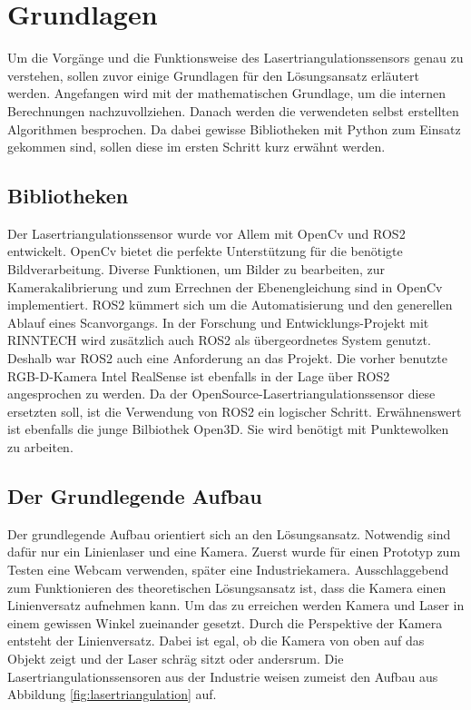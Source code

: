 \section{Grundlagen}\label{grundlagen}
	Um die Vorgänge und die Funktionsweise des Lasertriangulationssensors genau zu verstehen, sollen zuvor einige Grundlagen für den Lösungsansatz erläutert werden. Angefangen wird mit der mathematischen Grundlage, um die internen Berechnungen nachzuvollziehen. Danach werden die verwendeten selbst erstellten Algorithmen besprochen. Da dabei gewisse Bibliotheken mit Python zum Einsatz gekommen sind, sollen diese im ersten Schritt kurz erwähnt werden.
	
	\subsection{Bibliotheken}
	Der Lasertriangulationssensor wurde vor Allem mit OpenCv und ROS2 entwickelt. OpenCv bietet die perfekte Unterstützung für die benötigte Bildverarbeitung. Diverse Funktionen, um Bilder zu bearbeiten, zur Kamerakalibrierung und zum Errechnen der Ebenengleichung sind in OpenCv implementiert.
	ROS2 kümmert sich um die Automatisierung und den generellen Ablauf eines Scanvorgangs. In der Forschung und Entwicklungs-Projekt mit RINNTECH wird zusätzlich auch ROS2 als übergeordnetes System genutzt. Deshalb war ROS2 auch eine Anforderung an das Projekt. Die vorher benutzte RGB-D-Kamera Intel RealSense ist ebenfalls in der Lage über ROS2 angesprochen zu werden. Da der OpenSource-Lasertriangulationssensor diese ersetzten soll, ist die Verwendung von ROS2 ein logischer Schritt. Erwähnenswert  ist ebenfalls die junge Bilbiothek Open3D. Sie wird benötigt mit Punktewolken zu arbeiten.
	
	\subsection{Der Grundlegende Aufbau}
	Der grundlegende Aufbau orientiert sich an den Lösungsansatz. Notwendig sind dafür nur ein Linienlaser und eine Kamera. Zuerst wurde für einen Prototyp zum Testen eine Webcam verwenden, später eine Industriekamera. Ausschlaggebend zum Funktionieren des theoretischen Lösungsansatz ist, dass die Kamera einen Linienversatz aufnehmen kann. Um das zu erreichen werden Kamera und Laser in einem gewissen Winkel zueinander gesetzt. Durch die Perspektive der Kamera entsteht der Linienversatz. Dabei ist egal, ob die Kamera von oben auf das Objekt zeigt und der Laser schräg sitzt oder andersrum. Die Lasertriangulationssensoren aus der Industrie weisen zumeist den Aufbau aus Abbildung \ref{fig:lasertriangulation} auf.
	
